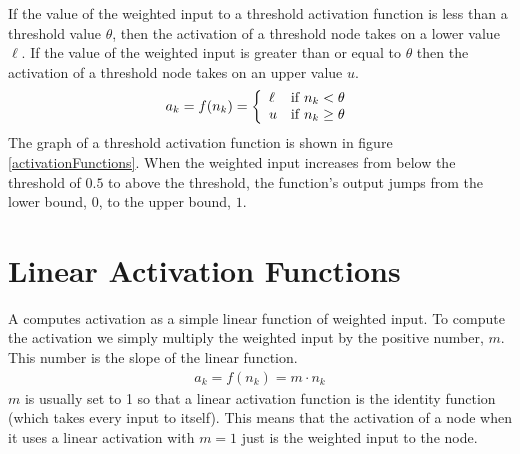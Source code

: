    If the value of the weighted input to a threshold activation function is less 
than a threshold value $\theta$, then the activation of a threshold 
node takes on a lower value $\ell$. If the value of the weighted input is greater 
than or equal to $\theta$ then the activation of a threshold node takes on an upper value 
$u$.
\begin{eqnarray*}
    a_k = f(n_k) =  \left\{
        \begin{array}{lc}
        \ell & {\rm if} \; n_k < \theta \\
        u  & {\rm if} \;  n_k \geq \theta
    \end{array} 
    \right.
\end{eqnarray*}
The graph of a  threshold activation function is shown in figure \ref{activationFunctions}. When the 
weighted input increases from below the threshold of $0.5$ to above the threshold,
the function's output jumps from the lower bound, $0$, to the upper bound, 
$1$.



\section{Linear Activation Functions}\label{S:linearact}

 A  computes activation as a simple linear function 
of weighted input. To compute the activation we simply multiply the weighted input 
by the positive number, $m$. This number is the slope of the linear function.
\begin{eqnarray*}
a_k = f(n_k) = m  \cdot n_k
\end{eqnarray*}
$m$ is usually set to 1 so that a linear activation function is the identity function (which takes every input to itself). This means that the activation of a node when it uses a linear activation with $m = 1$ just is the weighted input to the node.

